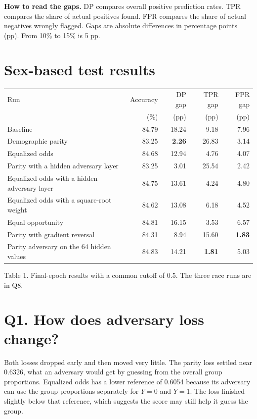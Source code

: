 \documentclass[11pt,letterpaper]{article}
\renewcommand{\arraystretch}{1.13}
\newcommand{\question}[2]{\section*{Q#1. #2}}
\begin{document}
\textbf{How to read the gaps.} DP compares overall positive prediction rates. TPR compares the share of actual positives found. FPR compares the share of actual negatives wrongly flagged. Gaps are absolute differences in percentage points (pp). From 10\% to 15\% is 5 pp.

\section*{Sex-based test results}

{\small\renewcommand{\arraystretch}{1.06}
\begin{tabularx}{\linewidth}{@{}Lrrrr@{}}
\toprule
Run & Accuracy & DP gap & TPR gap & FPR gap\\
 & (\%) & (pp) & (pp) & (pp)\\
\midrule
Baseline & 84.79 & 18.24 & 9.18 & 7.96\\
Demographic parity & 83.25 & \textbf{2.26} & 26.83 & 3.14\\
Equalized odds & 84.68 & 12.94 & 4.76 & 4.07\\
Parity with a hidden adversary layer & 83.25 & 3.01 & 25.54 & 2.42\\
Equalized odds with a hidden adversary layer & 84.75 & 13.61 & 4.24 & 4.80\\
Equalized odds with a square-root weight & 84.62 & 13.08 & 6.18 & 4.52\\
Equal opportunity & 84.81 & 16.15 & 3.53 & 6.57\\
Parity with gradient reversal & 84.31 & 8.94 & 15.60 & \textbf{1.83}\\
Parity adversary on the 64 hidden values & 84.83 & 14.21 & \textbf{1.81} & 5.03\\
\bottomrule
\end{tabularx}\par}
{\small\color{muted}Table 1. Final-epoch results with a common cutoff of 0.5. The three race runs are in Q8.\par}

\newpage
\question{1}{How does adversary loss change?}

Both losses dropped early and then moved very little. The parity loss settled near 0.6326, what an adversary would get by guessing from the overall group proportions. Equalized odds has a lower reference of 0.6054 because its adversary can use the group proportions separately for \(Y=0\) and \(Y=1\). The loss finished slightly below that reference, which suggests the score may still help it guess the group.
\end{document}
